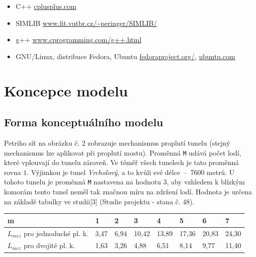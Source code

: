 \documentclass[11pt,a4paper]{article}
\begin{document}
      \begin{itemize}
        \item C++ \href{http://www.cplusplus.com/}{cplusplus.com}
        \item SIMLIB
          \href{http://www.fit.vutbr.cz/~peringer/SIMLIB/}
               {www.fit.vutbr.cz/\textasciitilde peringer/SIMLIB/}
        \item g++ \href{http://www.cprogramming.com/g++.html}
                       {www.cprogramming.com/g++.html}
        \item GNU/Linux, distribuce Fedora, Ubuntu
          \href{http://fedoraproject.org/}{fedoraproject.org/},
          \href{http://ubuntu.com}{ubuntu.com}
      \end{itemize}

  \section{Koncepce modelu}

    \subsection{Forma konceptuálního modelu}


      Petriho síť na obrázku č. 2 zobrazuje mechanismus proplutí tunelu
     (stejný mechanismus lze aplikovat při proplutí mostu).
      Proměnná \texttt{M} udává počet lodí, které vplouvají do tunelu zároveň.
      Ve téměř všech tunelech je tato proměnná rovna $1$. Výjimkou je tunel
      \textit{Vrcholový}, a to kvůli své délce \,--\, 7600 metrů. U tohoto
      tunelu je proměnná \texttt{M} nastavena na hodnotu $3$, aby vzhledem k
      blízkým komorám tento tunel neměl tak značnou míru na zdržení lodí.
      Hodnota je určena na základě tabulky ve
      studii[3] (Studie projektu - stana č. 48).

      \begin{center}
        \begin{tabular}{| l | l | l | l | l | l | l | l |}
          \hline
          m & 1 & 2 & 3 & 4 & 5 & 6 & 7 \\ \hline
          $L_{mez}$ pro jednoduché pl. k. 
            & 3,47 & 6,94 & 10,42 & 13,89 & 17,36 & 20,83 & 24,30 \\ \hline
          $L_{mez}$ pro dvojité pl. k.
            & 1,63 & 3,26 &  4,88 &  6,51 &  8,14 &  9,77 & 11,40 \\ \hline
          \end{tabular}
      \end{center}
\end{document}
